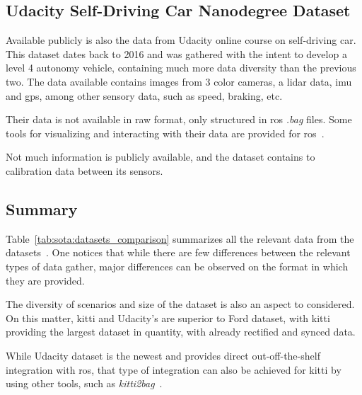 \subsection{Udacity Self-Driving Car Nanodegree Dataset}
Available publicly is also the data from Udacity online course on self-driving car. This dataset dates back to 2016 and was gathered with the intent to develop a level 4 autonomy vehicle, containing much more data diversity than the previous two. The data available contains images from 3 color cameras, a \ac{lidar} data, \ac{imu} and \ac{gps}, among other sensory data, such as speed, braking, etc.

Their data is not available in raw format, only structured in \ac{ros} \textit{.bag} files. Some tools for visualizing and interacting with their data are provided for \ac{ros}~\cite{udacity}. 

Not much information is publicly available, and the dataset contains to calibration data between its sensors.

\subsection{Summary}
Table~\ref{tab:sota:datasets_comparison} summarizes all the relevant data from the datasets~\cite{udacity, Pandey2011, Geiger2013a}. One notices that while there are few differences between the relevant types of data gather, major differences can be observed on the format in which they are provided. 

The diversity of scenarios and size of the dataset is also an aspect to considered. On this matter, \ac{kitti} and Udacity's are superior to Ford dataset, with \ac{kitti} providing the largest dataset in quantity, with already rectified and synced data. 

While Udacity dataset is the newest and provides direct out-off-the-shelf integration with \ac{ros}, that type of integration can also be achieved for \ac{kitti} by using other tools, such as \textit{kitti2bag}~\cite{TomasKrejci}. 
	
